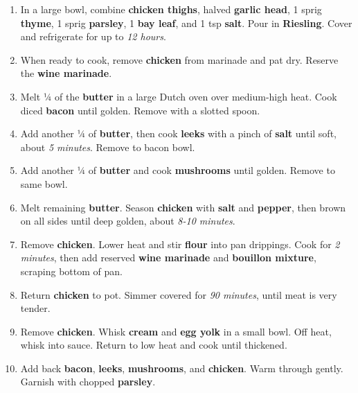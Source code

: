 \documentclass[11pt,letterpaper]{article}
\begin{document}
\begin{enumerate}
    \item In a large bowl, combine \textbf{chicken thighs}, halved \textbf{garlic head}, 1 sprig \textbf{thyme}, 1 sprig \textbf{parsley}, 1 \textbf{bay leaf}, and 1 tsp \textbf{salt}. Pour in \textbf{Riesling}. Cover and refrigerate for up to \textit{12 hours}.

    \item When ready to cook, remove \textbf{chicken} from marinade and pat dry. Reserve the \textbf{wine marinade}. 
    
    \item Melt ¼ of the \textbf{butter} in a large Dutch oven over medium-high heat. Cook diced \textbf{bacon} until golden. Remove with a slotted spoon.

    \item Add another ¼ of \textbf{butter}, then cook \textbf{leeks} with a pinch of \textbf{salt} until soft, about \textit{5 minutes}. Remove to bacon bowl.
    
    \item Add another ¼ of \textbf{butter} and cook \textbf{mushrooms} until golden. Remove to same bowl.

    \item Melt remaining \textbf{butter}. Season \textbf{chicken} with \textbf{salt} and \textbf{pepper}, then brown on all sides until deep golden, about \textit{8-10 minutes}.

    \item Remove \textbf{chicken}. Lower heat and stir \textbf{flour} into pan drippings. Cook for \textit{2 minutes}, then add reserved \textbf{wine marinade} and \textbf{bouillon mixture}, scraping bottom of pan.

    \item Return \textbf{chicken} to pot. Simmer covered for \textit{90 minutes}, until meat is very tender.

    \item Remove \textbf{chicken}. Whisk \textbf{cream} and \textbf{egg yolk} in a small bowl. Off heat, whisk into sauce. Return to low heat and cook until thickened.

    \item Add back \textbf{bacon}, \textbf{leeks}, \textbf{mushrooms}, and \textbf{chicken}. Warm through gently. Garnish with chopped \textbf{parsley}.
\end{enumerate}
\end{document}

